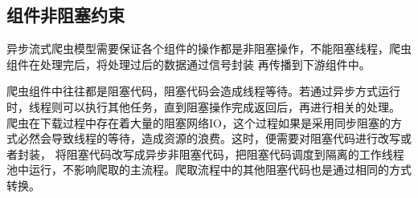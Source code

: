 \documentclass[master]{njuthesis}
\begin{document}


\subsection{组件非阻塞约束}
异步流式爬虫模型需要保证各个组件的操作都是非阻塞操作，不能阻塞线程，爬虫组件在处理完后，将处理过后的数据通过信号封装
再传播到下游组件中。

爬虫组件中往往都是阻塞代码，阻塞代码会造成线程等待。若通过异步方式运行时，线程则可以执行其他任务，直到阻塞操作完成返回后，再进行相关的处理。
爬虫在下载过程中存在着大量的阻塞网络IO，这个过程如果是采用同步阻塞的方式必然会导致线程的等待，造成资源的浪费。这时，便需要对阻塞代码进行改写或者封装，
将阻塞代码改写成异步非阻塞代码，把阻塞代码调度到隔离的工作线程池中运行，不影响爬取的主流程。爬取流程中的其他阻塞代码也是通过相同的方式转换。






\end{document}
